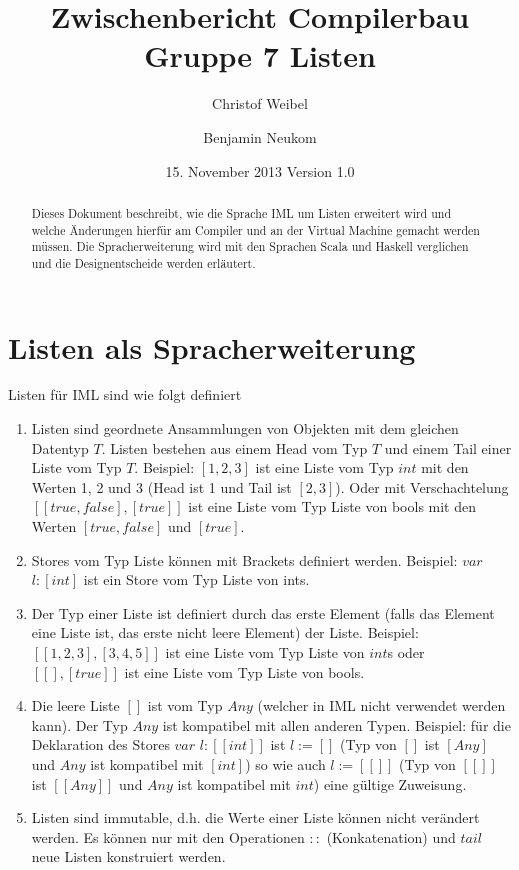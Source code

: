 \documentclass[a4paper,notitlepage,oneside]{scrartcl}
\title{Zwischenbericht Compilerbau Gruppe 7 Listen}
\author{Christof Weibel \and Benjamin Neukom}
\date{15. November 2013 Version 1.0}
\begin{document}
\maketitle

\begin{abstract}
Dieses  Dokument beschreibt, wie die Sprache IML um Listen erweitert wird und welche Änderungen hierfür am Compiler und an der Virtual Machine gemacht werden müssen. Die Spracherweiterung wird mit den Sprachen Scala und Haskell verglichen und die Designentscheide werden erläutert.
\end{abstract}


\section{Listen als Spracherweiterung}
Listen für IML sind wie folgt definiert

\begin{enumerate}

  \item Listen sind geordnete Ansammlungen von Objekten mit dem gleichen Datentyp $T$. Listen bestehen aus einem Head vom Typ $T$ und einem Tail einer Liste vom Typ $T$. Beispiel: $[1,2,3]$ ist eine Liste vom Typ $int$ mit den Werten 1, 2 und 3 (Head ist 1 und Tail ist $[2, 3]$). Oder mit Verschachtelung $[[true, false], [true]]$ ist eine Liste vom Typ Liste von bools mit den Werten $[true,false]$ und $[true]$.

  \item Stores vom Typ Liste können mit Brackets definiert werden. Beispiel: $var$ $l:[int]$ ist ein Store vom Typ Liste von ints.
    
  \item Der Typ einer Liste ist definiert durch das erste Element (falls das Element eine Liste ist, das erste nicht leere Element) der Liste. Beispiel:  $[[1,2,3],[3,4,5]]$ ist eine Liste vom Typ Liste von $int$s oder $[[], [true]]$ ist eine Liste vom Typ Liste von bools.

  \item Die leere Liste $[]$ ist vom Typ $Any$ (welcher in IML nicht verwendet werden kann). Der Typ $Any$ ist kompatibel mit allen anderen Typen. Beispiel: für die Deklaration des Stores $var$ $l:[[int]]$ ist $l := []$ (Typ von $[]$ ist $[Any]$ und $Any$ ist kompatibel mit $[int]$) so wie auch $l := [[]]$ (Typ von $[[]]$ ist $[[Any]]$ und $Any$ ist kompatibel mit $int$) eine gültige Zuweisung.

  \item Listen sind immutable, d.h. die Werte einer Liste können nicht verändert werden. Es können nur mit den Operationen $::$ (Konkatenation) und $tail$ neue Listen konstruiert werden.
\end{enumerate} 
\end{document}
